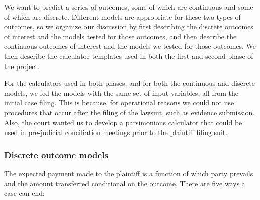 We want to predict a series of outcomes, some of which are continuous and some of which are discrete. Different models are appropriate for these two types of outcomes, so we organize our discussion by first describing the discrete outcomes of interest and the models tested for those outcomes, and then describe the continuous outcomes of interest and the models we tested for those outcomes. We then describe the calculator templates used in both the first and second phase of the project. 

 For the calculators used in both phases, and for both the continuous and discrete models, we fed the models with the same set of input variables, all from the initial case filing. This is because, for operational reasons we could not use procedures that occur after the filing of the lawsuit, such as evidence submission. Also, the court wanted us to develop a parsimonious calculator that could be used in pre-judicial conciliation meetings prior to the plaintiff filing suit.


\subsubsection*{Discrete outcome models}

The expected payment made to the plaintiff is a function of which party prevails and the amount transferred conditional on the outcome. There are five ways a case can end:


